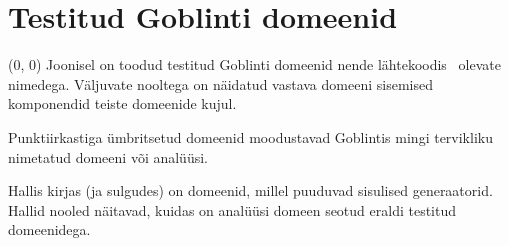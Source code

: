 \documentclass[../thesis.tex]{subfiles}
\begin{document}
\section{Testitud Goblinti domeenid}
\label{app:goblint-domeenid}
\begin{textblock}{5.5}(0, 0)
Joonisel on toodud testitud Goblinti domeenid nende lähtekoodis~\cite{goblint_repo} olevate nimedega. Väljuvate nooltega on näidatud vastava domeeni sisemised komponendid teiste domeenide kujul.

Punktiirkastiga ümbritsetud domeenid moodustavad Goblintis mingi tervikliku nimetatud domeeni või analüüsi.

Hallis kirjas (ja sulgudes) on domeenid, millel puuduvad sisulised generaatorid.
Hallid nooled näitavad, kuidas on analüüsi domeen seotud eraldi testitud domeenidega.
\end{textblock}
\vspace{-7ex} %
\end{document}
